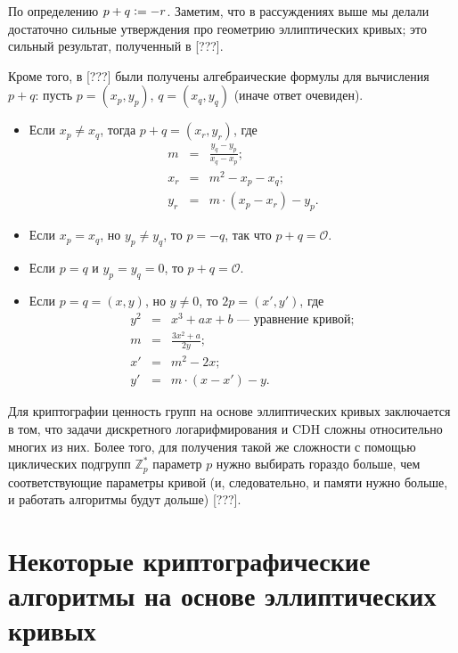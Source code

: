 \documentclass[a4paper,14pt]{extarticle}
\begin{document}
По определению $p + q \vcentcolon= -r$. Заметим, что в рассуждениях выше мы
делали достаточно сильные утверждения про геометрию эллиптических кривых; это
сильный результат, полученный в [???].

Кроме того, в [???] были получены алгебраические формулы для вычисления $p + q$:
пусть $p = (x_p, y_p)$, $q = (x_q, y_q)$ (иначе ответ очевиден).

\begin{itemize}
    \item Если $x_p \ne x_q$, тогда $p + q = (x_r, y_r)$, где
        \[
            \begin{array}{rcl}
                m &=& \frac{y_q - y_p}{x_q - x_p}; \\
                x_r &=& m^2 - x_p - x_q; \\
                y_r &=& m \cdot (x_p - x_r) - y_p.
            \end{array}
        \]
    \item Если $x_p = x_q$, но $y_p \ne y_q$, то $p = -q$, так что
        $p + q = \mathcal{O}$.
    \item Если $p = q$ и $y_p = y_q = 0$, то $p + q = \mathcal{O}$.
    \item Если $p = q = (x, y)$, но $y \ne 0$, то $2 p = (x', y')$, где
        \[
            \begin{array}{rcl}
                y^2 &=& x^3 + a x + b \text{ --- уравнение кривой}; \\
                m &=& \frac{3 x^2 + a}{2 y}; \\
                x' &=& m^2 - 2 x; \\
                y' &=& m \cdot (x - x') - y.
            \end{array}
        \]
\end{itemize}

Для криптографии ценность групп на основе эллиптических кривых заключается в
том, что задачи дискретного логарифмирования и CDH сложны относительно многих из
них. Более того, для получения такой же сложности с помощью циклических подгрупп
$\mathbb{Z}_p^*$ параметр $p$ нужно выбирать гораздо больше, чем соответствующие
параметры кривой (и, следовательно, и памяти нужно больше, и работать алгоритмы
будут дольше) [???].

\newpage

\section{Некоторые криптографические алгоритмы на основе эллиптических кривых}
\end{document}
